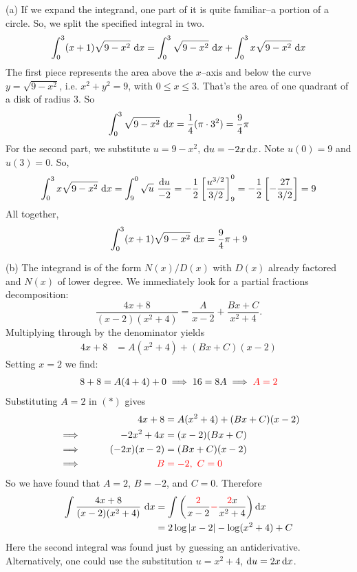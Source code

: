 \begin{solution} (a)
If we expand the integrand, one part of it is quite familiar--a portion of a circle.
So, we split the specified integral in two.
\begin{equation*}
\int_0^3(x+1)\sqrt{9-x^2} \ \mathrm{d}x
  = \int_0^3\sqrt{9-x^2} \ \mathrm{d}x
    +\int_0^3x\sqrt{9-x^2} \ \mathrm{d}x
\end{equation*}
The first piece represents the area above the $x$--axis and below the curve
$y=\sqrt{9-x^2}$, i.e. $x^2+y^2=9$, with $0\le x\le 3$. That's the area of
one quadrant of a disk of radius $3$. So
\begin{equation*}
\int_0^3\sqrt{9-x^2} \ \mathrm{d}x
 =\frac{1}{4}(\pi \cdot 3^2) = \frac{9}{4}\pi
\end{equation*}
For the second part, we substitute $u=9-x^2$, $\mathrm{d}u= -2x\,\mathrm{d}x$. Note
$u(0)=9$ and $u(3)=0$. So,
\begin{align*}
\int_0^3x\sqrt{9-x^2} \ \mathrm{d}x
= \int_9^0\sqrt{u} \ \frac{\mathrm{d}u}{-2}
=-\frac{1}{2}\left[\frac{u^{3/2}}{3/2}\right]_9^0
=-\frac{1}{2}\left[-\frac{27}{3/2}\right]
=9
\end{align*}
All together,
\begin{equation*}
\int_0^3(x+1)\sqrt{9-x^2} \ \mathrm{d}x = \frac{9}{4}\pi + 9
\end{equation*}

\noindent (b)
The integrand is of the form $N(x)/D(x)$ with $D(x)$ already factored
and $N(x)$ of lower degree. We immediately look for a partial fractions decomposition:
\begin{equation*}
\frac{4x+8}{(x-2)(x^2+4)} = \frac{A}{x-2} + \frac{Bx+C}{x^2+4}.
\end{equation*}
Multiplying through by the denominator yields
\begin{align}
4x+8 &= A(x^2+4) + (Bx+C)(x-2)
\tag{$*$}
\end{align}
Setting $x=2$ we find:
\begin{align*}
   8 +8 = A(4 + 4) + 0 \implies 16 =8A  \implies\color{red} A = 2
\end{align*}
Substituting $A=2$ in $(*)$ gives
\begin{alignat*}{2}
&&4x+8 &= A(x^2+4) + (Bx+C)(x-2) \\
  &\implies &  -2x^2+4 x &=(x-2)(Bx + C) \\
  &\implies\qquad &  (-2x)(x-2)&=(Bx + C)(x-2) \\
  & \implies& \color{red} B& \color{red} =-2,~C=0
\end{alignat*}
So we have found that $A=2$, $B=-2$, and $C=0$. Therefore
\begin{align*}
  \int\frac{4x+8}{(x-2)(x^2+4)}\ \mathrm{d}x &= \int \bigg( \frac{\textcolor{red}2}{x-2} \textcolor{red}- \frac{\textcolor{red}2x}{x^2+4} \bigg) \,\mathrm{d}x \\
   &=  2 \log |x-2| -  \log (x^2 + 4) + C
\end{align*}
Here the second integral was found just by guessing an antiderivative.
Alternatively, one could use the substitution $u=x^2+4$,
$\mathrm{d}u=2x\,\mathrm{d}x$.


\end{solution}
